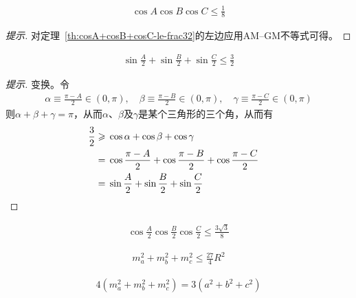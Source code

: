 \begin{theorem}
  \begin{align}
    \cos A \cos B \cos C \le \frac 18
  \end{align}
\end{theorem}
\begin{proof}[提示]
  对定理~\ref{th:cosA+cosB+cosC-le-frac32}的左边应用AM--GM不等式可得。
\end{proof}


\begin{theorem}
  \begin{align}
    \sin\frac A2 + \sin\frac B2 + \sin\frac C2\le \frac 32
  \end{align}
\end{theorem}
\begin{proof}[提示]
  变换。令
  \begin{align*}
    \alpha\equiv\frac{\pi-A}{2}\in(0,\pi),\quad
    \beta \equiv\frac{\pi-B}{2}\in(0,\pi),\quad
    \gamma\equiv\frac{\pi-C}{2}\in(0,\pi)
  \end{align*}
  则$\alpha + \beta + \gamma=\pi$，从而$\alpha$、$\beta$及$\gamma$是某个三角形的三个角，从而有
  \begin{align*}
    \frac 32\ge{}& \cos\alpha + \cos\beta + \cos\gamma\\
    ={}& \cos\frac{\pi-A}{2} + \cos\frac{\pi-B}{2} + \cos\frac{\pi-C}{2} \\
    ={}& \sin\frac A2 + \sin\frac B2 + \sin\frac C2 &\qedhere
  \end{align*}
\end{proof}

\begin{theorem}
  \begin{align}
    \cos\frac A2 \cos\frac B2 \cos\frac C2\le\frac{3\sqrt3}{8}
  \end{align}
\end{theorem}

\begin{theorem}
  \begin{align}
    m_a^2 + m_b^2 + m_c^2 \le \frac{27}{4}R^2
  \end{align}
\end{theorem}

\begin{theorem}
  \begin{align}
    4(m_a^2 + m_b^2 + m_c^2) = 3(a^2 + b^2 + c^2)
  \end{align}
\end{theorem}

